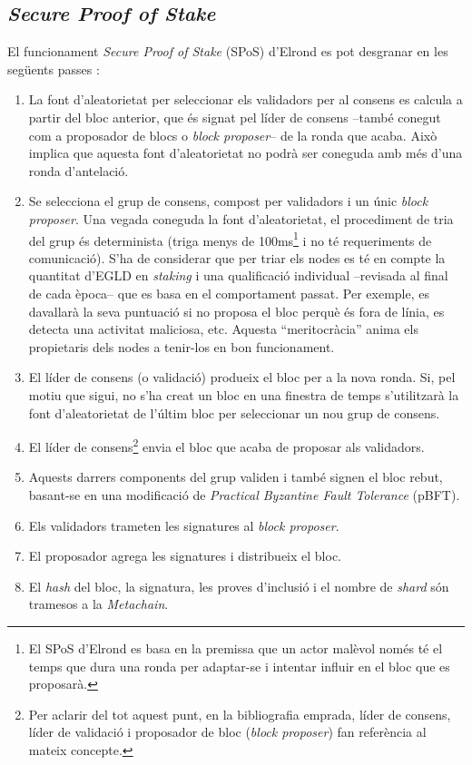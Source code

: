 \documentclass[11pt,a4paper]{article}
\begin{document}
\subsection{\textit{Secure Proof of Stake}}
El funcionament \textit{Secure Proof of Stake} (SPoS) d'Elrond es pot desgranar en les següents passes \cite{elrond2022}\cite{elrond2019}: 
\begin{enumerate}
    \item La font d'aleatorietat per seleccionar els validadors per al consens es calcula a partir del bloc anterior, que és signat pel líder de consens –també conegut com a proposador de blocs o \textit{block proposer}– de la ronda que acaba. Això implica que aquesta font d'aleatorietat no podrà ser coneguda amb més d'una ronda d'antelació.
    \item Se selecciona el grup de consens, compost per validadors i un únic \textit{block proposer}. Una vegada coneguda la font d'aleatorietat, el procediment de tria del grup és determinista (triga menys de 100ms\footnote{El SPoS d'Elrond es basa en la premissa que un actor malèvol només té el temps que dura una ronda per adaptar-se i intentar influir en el bloc que es proposarà.} i no té requeriments de comunicació). S'ha de considerar que per triar els nodes es té en compte la quantitat d'EGLD en \textit{staking} i una qualificació individual –revisada al final de cada època– que es basa en el comportament passat. Per exemple, es davallarà la seva puntuació si no proposa el bloc perquè és fora de línia, es detecta una activitat maliciosa, etc. Aquesta ``meritocràcia'' anima els propietaris dels nodes a tenir-los en bon funcionament. 
    \item  El líder de consens (o validació) produeix el  bloc per a la nova ronda. Si, pel motiu que sigui, no s'ha creat un bloc en una finestra de temps s'utilitzarà la font d'aleatorietat de l'últim bloc per seleccionar un nou grup de consens.
    \item El líder de consens\footnote{Per aclarir del tot aquest punt, en la bibliografia emprada, líder de consens, líder de validació i proposador de bloc (\textit{block proposer}) fan referència al mateix concepte.} envia el bloc que acaba de proposar als validadors.
    \item  Aquests darrers components del grup validen i també signen el bloc rebut, basant-se en una modificació de \textit{Practical Byzantine Fault Tolerance} (pBFT).
    \item Els validadors trameten les signatures al \textit{block proposer}.
    \item El proposador agrega les signatures i distribueix el bloc.
    \item El \textit{hash} del bloc, la signatura, les proves d'inclusió i el nombre de \textit{shard} són tramesos a la \textit{Metachain}. 
\end{enumerate}
\end{document}
